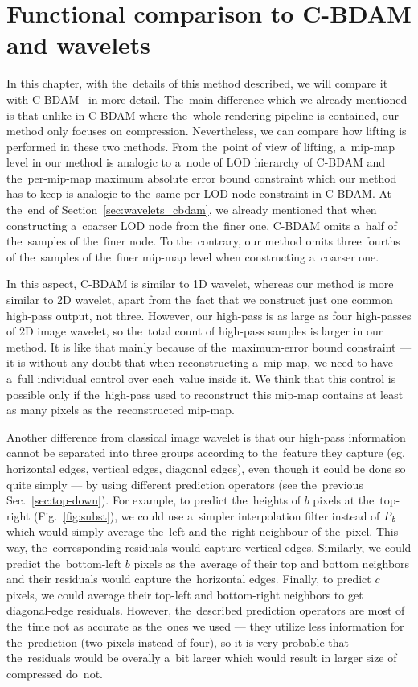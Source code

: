\chapter{Functional comparison to C-BDAM and wavelets}\label{chap:cbdam_comp}

In this chapter, with the~details of this method described, we will compare it with C-BDAM~\cite{cbdam} in more detail. The~main difference which we already mentioned is that unlike in C-BDAM where the~whole rendering pipeline is contained, our method only focuses on compression. Nevertheless, we can compare how lifting is performed in these two methods. From the~point of view of lifting, a~mip-map level in our method is analogic to a~node of LOD hierarchy of C-BDAM and the~per-mip-map maximum absolute error bound constraint which our method has to keep is analogic to the~same per-LOD-node constraint in C-BDAM. At the~end of Section~\ref{sec:wavelets_cbdam}, we already mentioned that when constructing a~coarser LOD node from the~finer one, C-BDAM omits a~half of the~samples of the~finer node. To the~contrary, our method omits three fourths of the~samples of the~finer mip-map level when constructing a~coarser one. 

In this aspect, C-BDAM is similar to 1D wavelet, whereas our method is more similar to 2D wavelet, apart from the~fact that we construct just one common high-pass output, not three. However, our high-pass is as large as four high-passes of 2D image wavelet, so the~total count of high-pass samples is larger in our method. It is like that mainly because of the~maximum-error bound constraint --- it is without any doubt that when reconstructing a~mip-map, we need to have a~full individual control over each~value inside it. We think that this control is possible only if the~high-pass used to reconstruct this mip-map contains at least as many pixels as the~reconstructed mip-map.

Another difference from classical image wavelet is that our high-pass information cannot be separated into three groups according to the~feature they capture (eg. horizontal edges, vertical edges, diagonal edges), even though it could be done so quite simply --- by using different prediction operators (see the~previous Sec.~\ref{sec:top-down}). For example, to predict the~heights of $b$ pixels at the~top-right (Fig.~\ref{fig:subst}), we could use a~simpler interpolation filter instead of $\mathit{P_{b}}$ which would simply average the~left and the~right neighbour of the~pixel. This way, the~corresponding residuals would capture vertical edges. Similarly, we could predict the~bottom-left $b$ pixels as the~average of their top and bottom neighbors and their residuals would capture the~horizontal edges. Finally, to predict $c$ pixels, we could average their top-left and bottom-right neighbors to get diagonal-edge residuals. However, the~described prediction operators are most of the~time not as accurate as the~ones we used --- they utilize less information for the~prediction (two pixels instead of four), so it is very probable that the~residuals would be overally a~bit larger which would result in larger size of compressed do~not.

